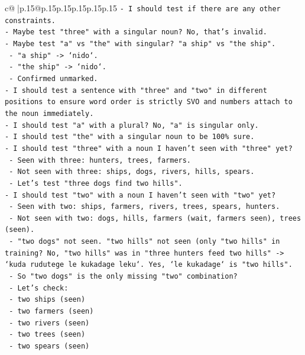 \documentclass{article}
\begin{document}
{\begin{supertabular}{c@{$\;$}|p{.15\linewidth}@{}p{.15\linewidth}p{.15\linewidth}p{.15\linewidth}p{.15\linewidth}p{.15\linewidth}}
{{{\texttt{{-} I should test if there are any other constraints.} \\
\texttt{{-} Maybe test "three" with a singular noun? No, that's invalid.} \\
\texttt{{-} Maybe test "a" vs "the" with singular? "a ship" vs "the ship".} \\
\texttt{  {-} "a ship" {-}> `nido`.} \\
\texttt{  {-} "the ship" {-}> `nido`.} \\
\texttt{  {-} Confirmed unmarked.} \\
\texttt{{-} I should test a sentence with "three" and "two" in different positions to ensure word order is strictly SVO and numbers attach to the noun immediately.} \\
\texttt{{-} I should test "a" with a plural? No, "a" is singular only.} \\
\texttt{{-} I should test "the" with a singular noun to be 100\% sure.} \\
\texttt{{-} I should test "three" with a noun I haven't seen with "three" yet?} \\
\texttt{  {-} Seen with three: hunters, trees, farmers.} \\
\texttt{  {-} Not seen with three: ships, dogs, rivers, hills, spears.} \\
\texttt{  {-} Let's test "three dogs find two hills".} \\
\texttt{{-} I should test "two" with a noun I haven't seen with "two" yet?} \\
\texttt{  {-} Seen with two: ships, farmers, rivers, trees, spears, hunters.} \\
\texttt{  {-} Not seen with two: dogs, hills, farmers (wait, farmers seen), trees (seen).} \\
\texttt{  {-} "two dogs" not seen. "two hills" not seen (only "two hills" in training? No, "two hills" was in "three hunters feed two hills" {-}> `kuda rudutege le kukadage leku`. Yes, `le kukadage` is "two hills".} \\
\texttt{  {-} So "two dogs" is the only missing "two" combination?} \\
\texttt{  {-} Let's check:} \\
\texttt{    {-} two ships (seen)} \\
\texttt{    {-} two farmers (seen)} \\
\texttt{    {-} two rivers (seen)} \\
\texttt{    {-} two trees (seen)} \\
\texttt{    {-} two spears (seen)} \\
}}}
\end{supertabular}}
\end{document}
